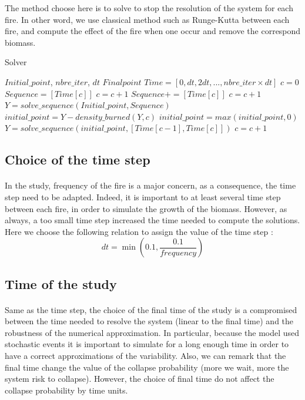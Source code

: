 \documentclass{article}
\begin{document}
The method choose here is to solve to stop the resolution of the system for each fire. In other word, we use classical method such as Runge-Kutta between each fire, and compute the effect of the fire when one occur and remove the correspond biomass.



\begin{algorithm}
\caption{Solver}
\begin{algorithmic}
\REQUIRE $Initial\_point$, $nbre\_iter$, $dt$
\ENSURE $Final point$
\STATE $Time = [0, dt, 2dt, ..., nbre\_iter \times dt]$
\STATE $c=0$
        \STATE $Sequence = [Time[c]]$
        \STATE  $c = c + 1$
            \STATE $Sequence += [Time[c]]$
            \STATE $c = c + 1$
        \ENDWHILE
        \STATE $Y = solve\_sequence(Initial\_point, Sequence)$
    \ELSE
        \STATE $initial\_point = Y - density\_burned(Y, c)$
        \STATE $initial\_point = max(initial\_point, 0)$
        \STATE $Y = solve\_sequence(initial\_point, [Time[c-1], Time[c]])$
        \STATE $c = c + 1$
    \ENDIF
\ENDWHILE
\end{algorithmic}
\end{algorithm}

\newpage

\subsection{Choice of the time step}

\paragraph{}
In the study, frequency of the fire is a major concern, as a consequence, the time step need to be adapted. Indeed, it is important to at least several time step between each fire, in order to simulate the growth of the biomass. However, as always, a too small time step increased the time needed to compute the solutions. Here we choose the following relation to assign the value of the time step :
\[
dt = \min(0.1, \frac{0.1}{frequency})
\]



\subsection{Time of the study}

\paragraph{}
Same as the time step, the choice of the final time of the study is a compromised between the time needed to resolve the system (linear to the final time) and the robustness of the numerical approximation. In particular, because the model used stochastic events it is important to simulate for a long enough time in order to have a correct approximations of the variability.
Also, we can remark that the final time change the value of the collapse probability (more we wait, more the system risk to collapse). However, the choice of final time do not affect the collapse probability by time units.
\end{document}
